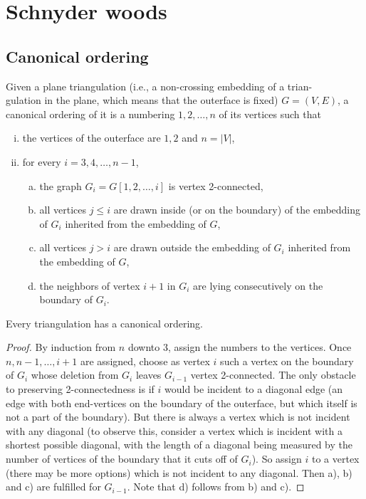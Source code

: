 \chapter{Schnyder woods}

\section{Canonical ordering}

\begin{defn}
	Given a plane triangulation (i.e., a non-crossing embedding of a trian-\\gulation in the plane, which means that the outerface is fixed) $G = (V, E)$, a canonical ordering of it is a numbering $1, 2, \dots, n$ of its vertices such that
	
	\begin{enumerate}[i)]
		\item the vertices of the outerface are $1, 2$ and $n = |V|$,
		\item for every $i = 3, 4, \dots, n - 1$,
		\begin{enumerate}[a)]
			\item the graph $G_i = G[1, 2, \dots, i]$ is vertex 2-connected,
			\item all vertices $j \leq i$ are drawn inside (or on the boundary) of the embedding of $G_i$ inherited from the embedding of $G$,
			\item all vertices $j > i$ are drawn outside the embedding of $G_i$ inherited from the embedding of $G$,
			\item the neighbors of vertex $i + 1$ in $G_i$ are lying consecutively on the boundary of $G_i$.
		\end{enumerate}
	\end{enumerate}
\end{defn}

\begin{thm}
	Every triangulation has a canonical ordering.
\end{thm}

\begin{proof}
	By induction from $n$ downto $3$, assign the numbers to the vertices. Once $n, n - 1, \dots, i + 1$ are assigned, choose as vertex $i$ such a vertex on the boundary of $G_i$ whose deletion from $G_i$ leaves $G_{i-1}$ vertex 2-connected. The only obstacle to preserving 2-connectedness is if $i$ would be incident to a diagonal edge (an edge with both end-vertices on the boundary of the outerface, but which itself is not a part of the boundary). But there is always a vertex which is not incident with any diagonal (to observe this, consider a vertex which is incident with a shortest possible diagonal, with the length of a diagonal being measured by the number of vertices of the boundary that it cuts off of $G_i$). So assign $i$ to a vertex (there may be more options) which is not incident to any diagonal. Then a), b) and c) are fulfilled for $G_{i-1}$. Note that d) follows from b) and c).
\end{proof}

